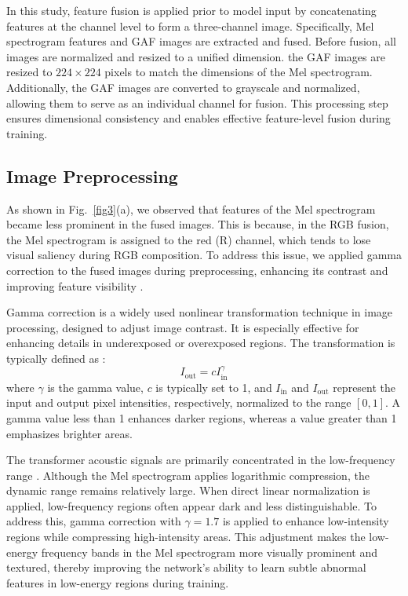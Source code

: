 \documentclass[final,5p,times,twocolumn]{elsarticle}
\begin{document}
In this study, feature fusion is applied prior to model input by concatenating features at the channel level to form a three-channel image. Specifically, Mel spectrogram features and GAF images are extracted and fused. Before fusion, all images are normalized and resized to a unified dimension. the GAF images are resized to \(224 \times 224\) pixels to match the dimensions of the Mel spectrogram. Additionally, the GAF images are converted to grayscale and normalized, allowing them to serve as an individual channel for fusion. This processing step ensures dimensional consistency and enables effective feature-level fusion during training.

\subsection{Image Preprocessing}
As shown in Fig.~\ref{fig3}(a), we observed that features of the Mel spectrogram became less prominent in the fused images. This is because, in the RGB fusion, the Mel spectrogram is assigned to the red (R) channel, which tends to lose visual saliency during RGB composition. To address this issue, we applied gamma correction to the fused images during preprocessing, enhancing its contrast and improving feature visibility \cite{11000314}. 

Gamma correction is a widely used nonlinear transformation technique in image processing, designed to adjust image contrast. It is especially effective for enhancing details in underexposed or overexposed regions. The transformation is typically defined as \cite{8362729}:
\begin{equation}
	I_{\text{out}} = c I_{\text{in}}^{\gamma}
\end{equation}
where \(\gamma\) is the gamma value, \(c\) is typically set to 1, and \(I_{\text{in}}\) and \(I_{\text{out}}\) represent the input and output pixel intensities, respectively, normalized to the range \([0,1]\). A gamma value less than 1 enhances darker regions, whereas a value greater than 1 emphasizes brighter areas. 

The transformer acoustic signals are primarily concentrated in the low-frequency range \cite{4712660}. Although the Mel spectrogram applies logarithmic compression, the dynamic range remains relatively large. When direct linear normalization is applied, low-frequency regions often appear dark and less distinguishable. To address this, gamma correction with \(\gamma=1.7\) is applied to enhance low-intensity regions while compressing high-intensity areas. This adjustment makes the low-energy frequency bands in the Mel spectrogram more visually prominent and textured, thereby improving the network's ability to learn subtle abnormal features in low-energy regions during training.
\end{document}
